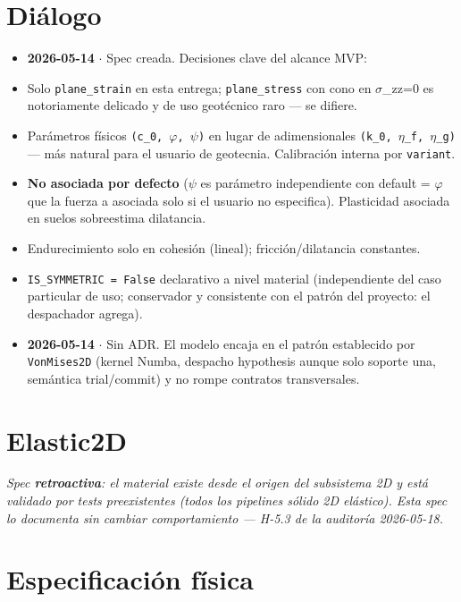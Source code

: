 \documentclass[11pt,letterpaper,oneside]{report}
\begin{document}
\section{Diálogo}

\begin{itemize}
  \item \textbf{2026-05-14} \ensuremath{\cdot} Spec creada. Decisiones clave del alcance MVP:
  \item Solo \texttt{plane\_strain} en esta entrega; \texttt{plane\_stress} con cono en \ensuremath{\sigma}\_zz=0 es notoriamente delicado y de uso geotécnico raro --- se difiere.
  \item Parámetros físicos \texttt{(c\_0, \ensuremath{\varphi}, \ensuremath{\psi})} en lugar de adimensionales \texttt{(k\_0, \ensuremath{\eta}\_f, \ensuremath{\eta}\_g)} --- más natural para el usuario de geotecnia. Calibración interna por \texttt{variant}.
  \item \textbf{No asociada por defecto} (\ensuremath{\psi} es parámetro independiente con default = \ensuremath{\varphi} que la fuerza a asociada solo si el usuario no especifica). Plasticidad asociada en suelos sobreestima dilatancia.
  \item Endurecimiento solo en cohesión (lineal); fricción/dilatancia constantes.
  \item \texttt{IS\_SYMMETRIC = False} declarativo a nivel material (independiente del caso particular de uso; conservador y consistente con el patrón del proyecto: el despachador agrega).
  \item \textbf{2026-05-14} \ensuremath{\cdot} Sin ADR. El modelo encaja en el patrón establecido por \texttt{VonMises2D} (kernel Numba, despacho hypothesis aunque solo soporte una, semántica trial/commit) y no rompe contratos transversales.
\end{itemize}


\newpage

\section{Elastic2D}



\textit{Spec \textbf{retroactiva}: el material existe desde el origen del subsistema 2D y está validado por tests preexistentes (todos los pipelines sólido 2D elástico). Esta spec lo documenta sin cambiar comportamiento --- H-5.3 de la auditoría 2026-05-18.}



\section{Especificación física}
\end{document}

